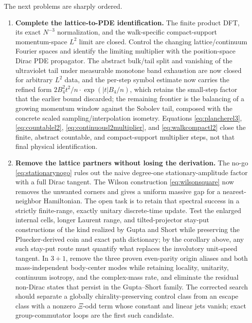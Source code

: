 \documentclass[11pt]{article}
\begin{document}
The next problems are sharply ordered.
\begin{enumerate}[leftmargin=2em]
  \item \textbf{Complete the lattice-to-PDE identification.}
  The finite product DFT, its exact $N^{-3}$ normalization, and the
  walk-specific compact-support momentum-space $L^2$ limit are closed.  Control
  the changing lattice/continuum Fourier spaces and identify the limiting
  multiplier with the position-space Dirac PDE propagator.  The abstract
  bulk/tail split and vanishing of the ultraviolet tail under measurable
  monotone band exhaustion are now closed for arbitrary $L^2$ data, and the
  per-step symbol estimate now carries the refined form
  $2B_4^2t^2/n\cdot\exp(|t|B_4/n)$, which retains the small-step factor
  that the earlier bound discarded; the remaining frontier is the
  balancing of a growing momentum window against the Sobolev tail,
  composed with the concrete scaled sampling/interpolation isometry.
  Equations \eqref{eq:plancherel3}, \eqref{eq:countablel2},
  \eqref{eq:continuousl2multiplier}, and \eqref{eq:walkcompactl2} close the
  finite, abstract countable, and compact-support multiplier steps, not that
  final physical identification.
  \item \textbf{Remove the lattice partners without losing the derivation.}
  The no-go \eqref{eq:stationarynogo} rules out the naive degree-one
  stationary-amplitude factor with a full Dirac tangent.  The Wilson
  construction \eqref{eq:wilsonsquare} now removes the unwanted corners and
  gives a uniform massive gap for a nearest-neighbor Hamiltonian.  The open
  task is to retain that spectral success in a strictly finite-range,
  exactly unitary discrete-time update.  Test the enlarged
  internal cells, longer Laurent range, and tilted-projector stay-put
  constructions of the kind realized by Gupta and Short
  \cite{GuptaShortDoubling} while preserving the
  Pluecker-derived coin and exact path dictionary; by the corollary above,
  any such stay-put route must quantify what replaces the involutory
  unit-speed tangent.  In $3+1$, remove the three
  proven even-parity origin
   aliases and both mass-independent body-center modes while retaining locality,
   unitarity, continuum isotropy, and the complex-mass rate, and eliminate
   the residual non-Dirac states that persist in the Gupta--Short family.
   The corrected search should separate a globally chirality-preserving control
   class from an escape class with a nonzero $\Xi$-odd term whose constant and
   linear jets vanish; exact group-commutator loops are the first such candidate.

\end{enumerate}
\end{document}
